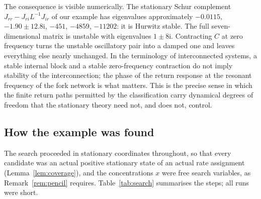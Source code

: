 \documentclass[11pt,a4paper]{article}
\theoremstyle{plain}
\theoremstyle{definition}
\theoremstyle{remark}
\numberwithin{equation}{section}
\newcommand{\iu}{\mathrm{i}}
\begin{document}
The consequence is visible numerically. The stationary Schur complement $J_{rr}-J_{ri}L^{-1}J_{ir}$ of our example has eigenvalues approximately $-0.0115$, $-1.90\pm12.8\iu$, $-451$, $-4859$, $-11202$: it is Hurwitz stable. The full seven-dimensional matrix is unstable with eigenvalues $1\pm8\iu$. Contracting $C$ at zero frequency turns the unstable oscillatory pair into a damped one and leaves everything else nearly unchanged. In the terminology of interconnected systems, a stable internal block and a stable zero-frequency contraction do not imply stability of the interconnection; the phase of the return response at the resonant frequency of the fork network is what matters. This is the precise sense in which the finite return paths permitted by the classification carry dynamical degrees of freedom that the stationary theory need not, and does not, control.

\subsection{How the example was found}\label{subsec:search}
The search proceeded in stationary coordinates throughout, so that every candidate was an actual positive stationary state of an actual rate assignment (Lemma~\ref{lem:coverage}), and the concentrations $x$ were free search variables, as Remark~\ref{rem:pencil} requires. Table~\ref{tab:search} summarises the steps; all runs were short.
\end{document}

